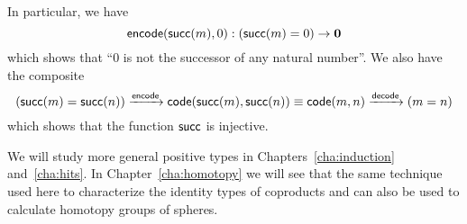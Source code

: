 In particular, we have
\[ \mathsf{encode}(\mathsf{succ}(m),0) : (\mathsf{succ}(m)=0) \to \mathbf{0} \]
which shows that ``$0$ is not the successor of any natural number''.
We also have the composite
\[ (\mathsf{succ}(m)=\mathsf{succ}(n)) \xrightarrow{\mathsf{encode}} \mathsf{code}(\mathsf{succ}(m),\mathsf{succ}(n)) \equiv \mathsf{code}(m,n) \xrightarrow{\mathsf{decode}} (m=n) \]
which shows that the function $\mathsf{succ}$ is injective.

We will study more general positive types in Chapters~\ref{cha:induction} and~\ref{cha:hits}.
In Chapter~\ref{cha:homotopy} we will see that the same technique used here to characterize the identity types of coproducts and \nat can also be used to calculate homotopy groups of spheres.











